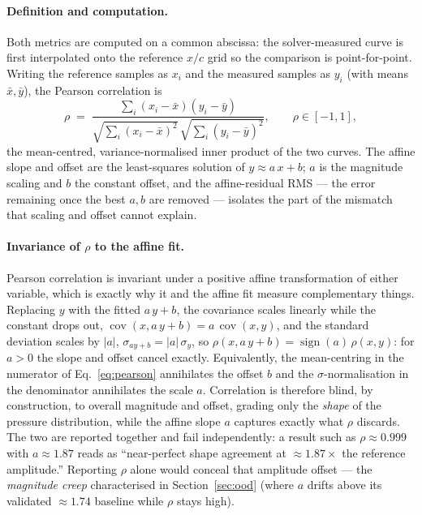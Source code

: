 \paragraph{Definition and computation.}
Both metrics are computed on a common abscissa: the solver-measured curve is first interpolated onto
the reference $x/c$ grid so the comparison is point-for-point. Writing the reference samples as $x_i$
and the measured samples as $y_i$ (with means $\bar{x}, \bar{y}$), the Pearson correlation is
\begin{equation}
  \rho \;=\; \frac{\sum_i (x_i - \bar{x})(y_i - \bar{y})}
                  {\sqrt{\sum_i (x_i - \bar{x})^2}\,\sqrt{\sum_i (y_i - \bar{y})^2}},
  \qquad \rho \in [-1, 1],
  \label{eq:pearson}
\end{equation}
the mean-centred, variance-normalised inner product of the two curves. The affine slope and offset are
the least-squares solution of $y \approx a\,x + b$; $a$ is the magnitude scaling and $b$ the constant
offset, and the affine-residual RMS --- the error remaining once the best $a, b$ are removed ---
isolates the part of the mismatch that scaling and offset cannot explain.

\paragraph{Invariance of $\rho$ to the affine fit.}
Pearson correlation is invariant under a positive affine transformation of either variable, which is
exactly why it and the affine fit measure complementary things. Replacing $y$ with the fitted
$a\,y + b$, the covariance scales linearly while the constant drops out,
$\operatorname{cov}(x, a\,y + b) = a\,\operatorname{cov}(x, y)$, and the standard deviation scales by
$|a|$, $\sigma_{a y + b} = |a|\,\sigma_y$, so $\rho(x, a\,y + b) = \operatorname{sign}(a)\,\rho(x, y)$:
for $a > 0$ the slope and offset cancel exactly. Equivalently, the mean-centring in the numerator of
Eq.~\eqref{eq:pearson} annihilates the offset $b$ and the $\sigma$-normalisation in the denominator
annihilates the scale $a$. Correlation is therefore blind, by construction, to overall magnitude and
offset, grading only the \emph{shape} of the pressure distribution, while the affine slope $a$ captures
exactly what $\rho$ discards. The two are reported together and fail independently: a result such as
$\rho \approx 0.999$ with $a \approx 1.87$ reads as ``near-perfect shape agreement at ${\approx}1.87\times$
the reference amplitude.'' Reporting $\rho$ alone would conceal that amplitude offset --- the
\emph{magnitude creep} characterised in Section~\ref{sec:ood} (where $a$ drifts above its validated
${\approx}1.74$ baseline while $\rho$ stays high).

